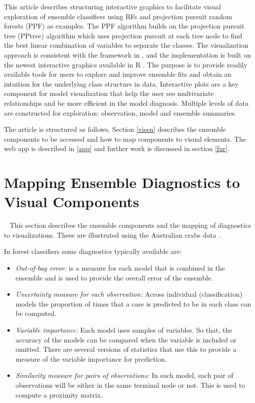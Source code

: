 \documentclass[10pt, legalpaper, twoside]{article}\usepackage[]{graphicx}\usepackage[]{color}
\begin{document}
This article describes structuring interactive graphics to facilitate visual exploration of ensemble classifiers using RFs and projection pursuit random forests (PPF) \cite{da2021projection} as examples. The PPF algorithm builds on the projection pursuit tree (PPtree) \cite{lee2013pptree} algorithm which uses projection pursuit at each tree node to find the best linear combination of variables to separate the classes. The visualization approach is consistent with the framework in \cite{wickham2015visualizing}, and the implementation is built on the newest interactive graphics available in R \cite{RCore}. The purpose is to provide readily available tools for users to explore and improve ensemble fits and obtain an intuition for the underlying class structure in data. Interactive plots are a key component for model visualization that help the user see multivariate relationships and be more efficient in the model diagnosis. Multiple levels of data are constructed for exploration: observation, model and ensemble summaries.

The article is structured as follows.  Section \ref{visen} describes the ensemble components to be accessed and how to map components to visual elements. The web app is described in \ref{app} and further work is discussed in section \ref{fur}.

\section{Mapping Ensemble Diagnostics to Visual Components}~\label{visen}
This section describes the ensemble components and the mapping of diagnostics to visualizations. These are illustrated using the Australian crabs data \cite{CM74}. 

In forest classifiers some diagnostics typically available are:

\begin{itemize} \itemsep 0in
\item {\em Out-of-bag error:}  is a measure for each model that is combined in the ensemble and is used to provide the overall error of the ensemble.
  
\item {\em Uncertainty measure for each observation:} Across individual (classification) models  the proportion of times that a case is predicted to be in each class can be computed. 

\item {\em Variable importance:} Each model uses samples of variables. So that, the accuracy of the models can be compared when the variable is included or omitted. There are several versions of statistics that use this to provide a measure of the variable importance for prediction.

\item {\em Similarity measure for pairs of observations:} In each model, each pair of observations will be either in the same terminal node or not. This is used to compute a proximity matrix. 
\end{itemize}
\end{document}

